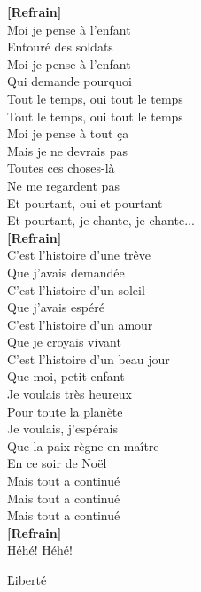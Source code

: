 \documentclass{novel}
\begin{document}
\begin{multicols}{2}
\textbf{[Refrain]} \\



Moi je pense à l'enfant \\
Entouré des soldats \\
Moi je pense à l'enfant \\
Qui demande pourquoi \\
Tout le temps, oui tout le temps \\
Tout le temps, oui tout le temps \\
Moi je pense à tout ça \\
Mais je ne devrais pas \\
Toutes ces choses-là \\
Ne me regardent pas \\
Et pourtant, oui et pourtant \\
Et pourtant, je chante, je chante... \\

\textbf{[Refrain]} \\

C'est l'histoire d'une trêve \\
Que j'avais demandée \\
C'est l'histoire d'un soleil \\
Que j'avais espéré \\
C'est l'histoire d'un amour \\
Que je croyais vivant \\
C'est l'histoire d'un beau jour \\
Que moi, petit enfant \\
Je voulais très heureux \\
Pour toute la planète \\
Je voulais, j'espérais \\
Que la paix règne en maître \\
En ce soir de Noël \\
Mais tout a continué \\
Mais tout a continué \\
Mais tout a continué \\

\textbf{[Refrain]} \\

Héhé! Héhé!
\end{multicols}

\newpage
\Large

\h*{Liberté}
\end{document}
